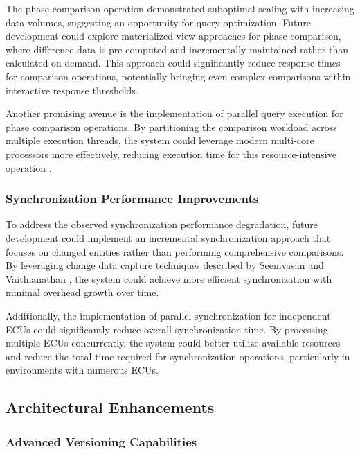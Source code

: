 The phase comparison operation demonstrated suboptimal scaling with increasing data volumes, suggesting an opportunity for query optimization. Future development could explore materialized view approaches for phase comparison, where difference data is pre-computed and incrementally maintained rather than calculated on demand. This approach could significantly reduce response times for comparison operations, potentially bringing even complex comparisons within interactive response thresholds.

Another promising avenue is the implementation of parallel query execution for phase comparison operations. By partitioning the comparison workload across multiple execution threads, the system could leverage modern multi-core processors more effectively, reducing execution time for this resource-intensive operation \cite{obe2017postgresql}.

\subsubsection{Synchronization Performance Improvements}
\label{subsubsec:synchronization-improvements}

To address the observed synchronization performance degradation, future development could implement an incremental synchronization approach that focuses on changed entities rather than performing comprehensive comparisons. By leveraging change data capture techniques described by Seenivasan and Vaithianathan \cite{seenivasan2023real}, the system could achieve more efficient synchronization with minimal overhead growth over time.

Additionally, the implementation of parallel synchronization for independent \acp{ECU} could significantly reduce overall synchronization time. By processing multiple \acp{ECU} concurrently, the system could better utilize available resources and reduce the total time required for synchronization operations, particularly in environments with numerous \acp{ECU}.

\subsection{Architectural Enhancements}
\label{subsec:architectural-enhancements}

\subsubsection{Advanced Versioning Capabilities}
\label{subsubsec:advanced-versioning}

